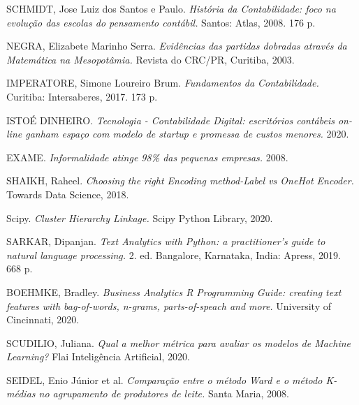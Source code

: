 \documentclass[twocolumn]{rbef}
\newcommand{\1}{\mathbbm{1}}
\begin{document}
\begin{thebibliography}{99}
  

 SCHMIDT, Jose Luiz dos Santos e Paulo. 
    \textit{História da Contabilidade: foco na evolução das escolas do pensamento contábil.} Santos: Atlas, 2008. 176 p.

 NEGRA, Elizabete Marinho Serra.
    \textit{Evidências das partidas dobradas através da Matemática na Mesopotâmia.} Revista do CRC/PR, Curitiba, 2003.

 IMPERATORE, Simone Loureiro Brum.
    \textit{Fundamentos da Contabilidade.} Curitiba: Intersaberes, 2017. 173 p.

 ISTOÉ DINHEIRO.
    \textit{Tecnologia - Contabilidade Digital: escritórios contábeis on-line ganham espaço com modelo de startup e promessa de custos menores.} 2020.

 EXAME.
    \textit{Informalidade atinge 98\% das pequenas empresas.} 2008.

 SHAIKH, Raheel.
    \textit{Choosing the right Encoding method-Label vs OneHot Encoder.} Towards Data Science, 2018.

 Scipy.
    \textit{Cluster Hierarchy Linkage.} Scipy Python Library, 2020.

 SARKAR, Dipanjan.
    \textit{Text Analytics with Python: a practitioner's guide to natural language processing.} 2. ed. Bangalore, Karnataka, India: Apress, 2019. 668 p.

 BOEHMKE, Bradley.
    \textit{Business Analytics R Programming Guide: creating text features with bag-of-words, n-grams, parts-of-speach and more.} University of Cincinnati, 2020.

 SCUDILIO, Juliana.
    \textit{Qual a melhor métrica para avaliar os modelos de Machine Learning?} Flai Inteligência Artificial, 2020.

 SEIDEL, Enio Júnior et al.
    \textit{Comparação entre o método Ward e o método K-médias no agrupamento de produtores de leite.} Santa Maria, 2008.

\end{thebibliography}
\end{document}
